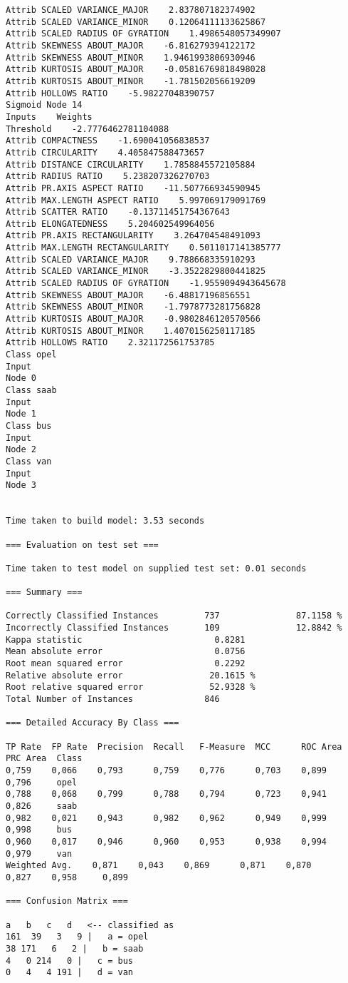 \documentclass[
	article,			%
	11pt,				%
	oneside,			%
	a4paper,			%
	english,			%
	brazil,				%
	sumario=tradicional
	]{abntex2}
\begin{document}
\begin{lstlisting}
Attrib SCALED VARIANCE_MAJOR    2.837807182374902
Attrib SCALED VARIANCE_MINOR    0.12064111133625867
Attrib SCALED RADIUS OF GYRATION    1.4986548057349907
Attrib SKEWNESS ABOUT_MAJOR    -6.816279394122172
Attrib SKEWNESS ABOUT_MINOR    1.9461993806930946
Attrib KURTOSIS ABOUT_MAJOR    -0.05816769818498028
Attrib KURTOSIS ABOUT_MINOR    -1.781502056619209
Attrib HOLLOWS RATIO    -5.98227048390757
Sigmoid Node 14
Inputs    Weights
Threshold    -2.7776462781104088
Attrib COMPACTNESS    -1.690041056838537
Attrib CIRCULARITY    4.405847588473657
Attrib DISTANCE CIRCULARITY    1.7858845572105884
Attrib RADIUS RATIO    5.238207326270703
Attrib PR.AXIS ASPECT RATIO    -11.507766934590945
Attrib MAX.LENGTH ASPECT RATIO    5.997069179091769
Attrib SCATTER RATIO    -0.13711451754367643
Attrib ELONGATEDNESS    5.204602549964056
Attrib PR.AXIS RECTANGULARITY    3.264704548491093
Attrib MAX.LENGTH RECTANGULARITY    0.5011017141385777
Attrib SCALED VARIANCE_MAJOR    9.788668335910293
Attrib SCALED VARIANCE_MINOR    -3.3522829800441825
Attrib SCALED RADIUS OF GYRATION    -1.9559094943645678
Attrib SKEWNESS ABOUT_MAJOR    -6.48817196856551
Attrib SKEWNESS ABOUT_MINOR    -1.7978773281756828
Attrib KURTOSIS ABOUT_MAJOR    -0.9802846120570566
Attrib KURTOSIS ABOUT_MINOR    1.4070156250117185
Attrib HOLLOWS RATIO    2.321172561753785
Class opel
Input
Node 0
Class saab
Input
Node 1
Class bus
Input
Node 2
Class van
Input
Node 3


Time taken to build model: 3.53 seconds

=== Evaluation on test set ===

Time taken to test model on supplied test set: 0.01 seconds

=== Summary ===

Correctly Classified Instances         737               87.1158 %
Incorrectly Classified Instances       109               12.8842 %
Kappa statistic                          0.8281
Mean absolute error                      0.0756
Root mean squared error                  0.2292
Relative absolute error                 20.1615 %
Root relative squared error             52.9328 %
Total Number of Instances              846     

=== Detailed Accuracy By Class ===

TP Rate  FP Rate  Precision  Recall   F-Measure  MCC      ROC Area  PRC Area  Class
0,759    0,066    0,793      0,759    0,776      0,703    0,899     0,796     opel
0,788    0,068    0,799      0,788    0,794      0,723    0,941     0,826     saab
0,982    0,021    0,943      0,982    0,962      0,949    0,999     0,998     bus
0,960    0,017    0,946      0,960    0,953      0,938    0,994     0,979     van
Weighted Avg.    0,871    0,043    0,869      0,871    0,870      0,827    0,958     0,899     

=== Confusion Matrix ===

a   b   c   d   <-- classified as
161  39   3   9 |   a = opel
38 171   6   2 |   b = saab
4   0 214   0 |   c = bus
0   4   4 191 |   d = van


\end{lstlisting}
\end{document}
